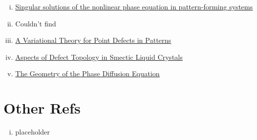 \documentclass[12pt]{article}
\newcounter{solution}
\begin{document}
\begin{enumerate}[(i)]
\item \href{https://pdf.sciencedirectassets.com/271541/1-s2.0-S0375960100X13382/1-s2.0-037596019190691Z/main.pdf?X-Amz-Security-Token=IQoJb3JpZ2luX2VjEMz%2F%2F%2F%2F%2F%2F%2F%2F%2F%2FwEaCXVzLWVhc3QtMSJIMEYCIQDmgJCN2AXkLqtHlQc%2BSmt23BPsqbA%2FWFrocuHJ5wB4BAIhAM%2FiV0%2BhuJU5d0JkH2aI6SD0IcEPYQexdv%2F66XjjZa3GKtIECFUQBRoMMDU5MDAzNTQ2ODY1IgzlMl0HU6icOlO2OLUqrwTmMqvLGAzFqfbnF7Cv7v98kHGPoB%2FYF%2FFBxg7s1F8d8bifhuil9hzMLkFk4wsyGrDrPjskhbLBGDlyPNaMvPL02VoQvVQQdAI2Mev9OOZdZmVx0RBJJYzRdyXwQNUVqjpkRuEuOrLmIH3q9122ts98vZ043Ht4fdEaMfP7QULxQuMPr9oYcjVp0UCbVbs0tQwvQyLhRq61SxRta7rATbBmnKXxLhuE5B44QVoKKj4p7PG9WveN0B2YsTzOye3ka0u35%2FrO7vE7EP3vOhZ2VK4y4adI%2FcSW4iamBgf%2F6J6zxzakx0GLGDed10WjOsoEuNzKzKX3pf1Z%2BD%2Frv1CoI1jrsr6knS6tT5IW9fLOXlJqsgl%2BDmrpd8hSP%2Bf9lponX8jSYxi3q6ICp68RMmZOYihkQIyS6EfuOjrRsqTgQBLMXBtYQNvJefhTTkt%2BCLCcsVESTMuHK4D4Mfnv%2BkTRE6C7kk8%2BduqsvUANhghmH%2FFyBA3ZX7ZvhwzW0px0ysyeq%2FvrznYznvA66crCMPZCAZ8nMs844QTaShXdaOSTkgs1KjF8MITLsDMqqhUiOxenwyIT1bCmCObo3m6OtRnZiybqICNv4sfagR3bwhvkfxzgaYz0VIYJ%2F5NofniPpY7eTuP8gPCled%2FjvKmZbropA2%2F%2B3ldYFQfSmB2F8iFjv3%2Bq2%2BQQ0LQqFVK%2BxEyINNP9T1lMhQmPiX3ZaqD6H9L7sA%2BtofzF7IOGroipJ9Tr31rGMO%2Bsu5gGOqgBqAJ177QWbZXYnyInbh03fR%2FCtJJiVGegVZD1KVfxFMVbIIyxFido1ooHEGM%2F6NTjI3Qb9PQkuiKq%2FR74BCOsyYMYLpG%2FMTduVKwOkY4SEMjb6qepRKJnJXUv3ZKrfXT%2Fga44QEYuXDIgyWtBK5hwv8YWPYLZuAVrZlW4WaEXwYx2ksKL82WyIBm2kYYWE69S9WgSzs2EekG%2BRep3LUoEc4lnG4Ave9XC&X-Amz-Algorithm=AWS4-HMAC-SHA256&X-Amz-Date=20220831T041218Z&X-Amz-SignedHeaders=host&X-Amz-Expires=300&X-Amz-Credential=ASIAQ3PHCVTYYLVF2N6X%2F20220831%2Fus-east-1%2Fs3%2Faws4_request&X-Amz-Signature=7667da2fbbb74b6639bc8128efd3ee63232c4032ce9f0015b62a1f08591ed86e&hash=11854fd2fdbbbfc1d59068dd657af6ae7f2fd381b9c20f50f3edc1d66c5f70c2&host=68042c943591013ac2b2430a89b270f6af2c76d8dfd086a07176afe7c76c2c61&pii=037596019190691Z&tid=spdf-288c08ba-e923-43b8-a6de-ec98e989788f&sid=f4108f064053494679698ac9f79c6b821331gxrqa&type=client&ua=4d54575503045b5a0206&rr=7432ed58aeef1b14}{Singular solutions of the nonlinear phase equation in pattern-forming systems}
    \item Couldn't find
    \item \href{https://link-springer-com.ezproxy2.library.arizona.edu/content/pdf/10.1007/s00332-008-9035-9.pdf}{A Variational Theory for Point Defects in Patterns}
    \item \href{https://link.springer.com/content/pdf/10.1007/s00220-019-03366-y.pdf}{Aspects of Defect Topology in Smectic Liquid Crystals}
    \item \href{https://www.math.arizona.edu/~anewell/publications/Geometry_Phase_Diffusion_Eq.pdf}{The Geometry of the Phase Diffusion Equation}
\end{enumerate}

\section{Other Refs}
\begin{enumerate}[(i)]
\item placeholder
\end{enumerate}
\end{document}
